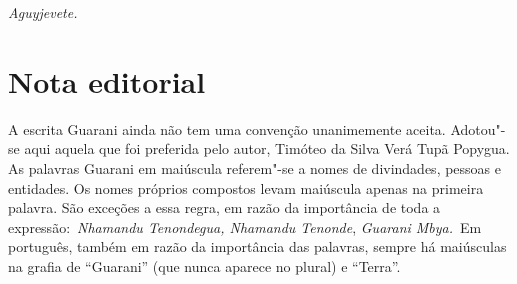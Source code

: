 \medskip{} 

\emph{Aguyjevete.}

 

 

\section{Nota editorial}

A escrita Guarani ainda não tem uma convenção unanimemente aceita.
Adotou"-se aqui aquela que foi preferida pelo autor, Timóteo da Silva
Verá Tupã Popygua. As palavras Guarani em maiúscula referem"-se a nomes
de divindades, pessoas e entidades. Os nomes próprios compostos levam
maiúscula apenas na primeira palavra. São exceções a essa regra, em
razão da importância de toda a expressão:~\emph{Nhamandu Tenondegua,
Nhamandu Tenonde}, \emph{Guarani Mbya.}~Em português, também em razão da
importância das palavras, sempre há maiúsculas na grafia de ``Guarani''
(que nunca aparece no plural) e ``Terra''.
